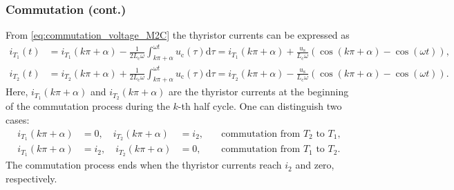 \begin{frame}[c]
    \frametitle{Commutation (cont.)}
    From \eqref{eq:commutation_voltage_M2C} the thyristor currents can be expressed as
    \begin{equation*}
        \begin{split}
            i_{T_1}(t) &= i_{T_1}(k\pi+\alpha) - \frac{1}{2L_\mathrm{c}\omega}\int_{k\pi+\alpha}^{\omega t} u_{\mathrm{c}}(\tau) \mathrm{d}\tau = i_{T_1}(k\pi+\alpha) + \frac{u_\mathrm{s}}{L_\mathrm{c}\omega}\left(\cos(k\pi+ \alpha)-\cos(\omega t)\right),\\
            i_{T_2}(t) &= i_{T_2}(k\pi+\alpha) + \frac{1}{2L_\mathrm{c}\omega}\int_{k\pi+\alpha}^{\omega t} u_{\mathrm{c}}(\tau) \mathrm{d}\tau = i_{T_2}(k\pi+\alpha) - \frac{u_\mathrm{s}}{L_\mathrm{c}\omega}\left(\cos(k\pi+ \alpha)-\cos(\omega t)\right).
        \end{split}
    \end{equation*} 
    Here, $i_{T_1}(k\pi+\alpha)$ and $i_{T_2}(k\pi+\alpha)$ are the thyristor currents at the beginning of the commutation process during the $k$-th half cycle. One can distinguish two cases:
    \begin{equation*}
        \begin{alignedat}{3}
        i_{T_1}(k\pi+\alpha) &= 0, \quad i_{T_2}(k\pi+\alpha) &=i_2, \quad &\mbox{commutation from $T_2$ to $T_1$},\\
        i_{T_1}(k\pi+\alpha) &= i_2, \quad i_{T_2}(k\pi+\alpha) &= 0, \quad &\mbox{commutation from $T_1$ to $T_2$}.
        \end{alignedat}
    \end{equation*}
    The commutation process ends when the thyristor currents reach $i_2$ and zero, respectively.
\end{frame}

